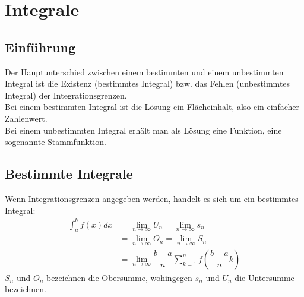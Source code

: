 \chapter{Integrale}
\section{Einführung}
Der Hauptunterschied zwischen einem bestimmten und einem unbestimmten Integral ist die Existenz (bestimmtes Integral) bzw. das Fehlen
(unbestimmtes Integral) der Integrationsgrenzen.\\
Bei einem bestimmten Integral ist die Lösung ein Flächeinhalt, also ein einfacher Zahlenwert.\\
Bei einem unbestimmten Integral erhält man als Lösung eine Funktion, eine sogenannte Stammfunktion.\\


\section{Bestimmte Integrale}
\begin{Definition}
  Wenn Integrationsgrenzen angegeben werden, handelt es sich um ein bestimmtes Integral:
  \begin{align*}
    \int_{a}^{b} f(x)dx & = \lim\limits_{n \rightarrow \infty} U_n = \lim\limits_{n \rightarrow \infty} s_n\\
                        & = \lim\limits_{n \rightarrow \infty} O_n = \lim\limits_{n \rightarrow \infty} S_n\\
                        & = \lim\limits_{n \rightarrow \infty} \dfrac{b-a}{n}\sum\limits_{k=1}^{n}f(\dfrac{b-a}{n}k)
  \end{align*}
  $S_n$ und $O_n$ bezeichnen die Obersumme, wohingegen $s_n$ und $U_n$ die Untersumme bezeichnen.
\end{Definition}

